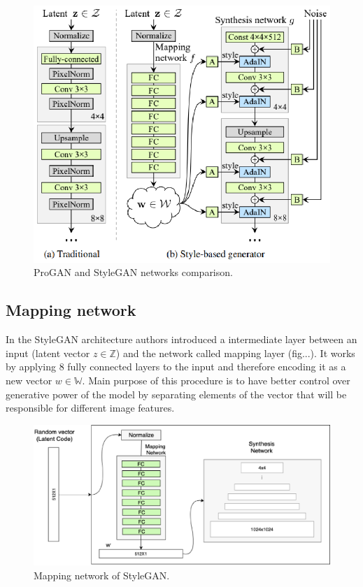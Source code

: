 \documentclass[12pt,a4paper,openany]{book}
\begin{document}
\begin{figure}[ht!]
    \centering
    \includegraphics[scale=1.5]{figs/stylegan-scheme.eps}
    \caption{ProGAN and StyleGAN networks comparison.}\label{Fig:STYLEGAN}
\end{figure}


\subsection{Mapping network}

In the StyleGAN architecture authors introduced a intermediate layer between an input (latent vector $z \in \mathbb{Z}$) and the network called mapping layer (fig...). It works by applying 8 fully connected layers to the input and therefore encoding it as a new vector $w \in \mathbb{W}$. Main purpose of this procedure is to have better control over generative power of the model by separating elements of the vector that will be responsible for different image features.


\begin{figure}[ht!]
    \centering
    \includegraphics[scale=0.3]{figs/mapping-network.eps}
    \caption{Mapping network of StyleGAN.}\label{Fig:STYLEGAN}
\end{figure}
\end{document}
